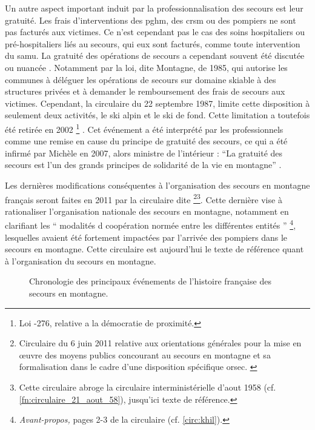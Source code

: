 Un autre aspect important induit par la professionnalisation des
secours est leur gratuité. Les frais d'interventions des \ac{pghm},
des \ac{crsm} ou des pompiers ne sont pas facturés aux victimes. Ce
n'est cependant pas le cas des soins hospitaliers ou pré-hospitaliers
liés au secours, qui eux sont facturés, comme toute intervention du
\ac{samu}. La gratuité des opérations de secours a cependant souvent
été discutée ou nuancée \autocite{CFDLD, Halle2007,
  Magne2017}. Notamment par la loi, dite Montagne, de 1985, qui
autorise les communes à déléguer les opérations de secours sur domaine
skiable à des structures privées et à demander le remboursement des
frais de secours aux victimes. Cependant, la circulaire du 22
septembre 1987, limite cette disposition à seulement deux activités,
le ski alpin et le ski de fond. Cette limitation a toutefois été
retirée en 2002 \footnote{Loi -276, relative a la démocratie
  de proximité.}  \autocite{Magne2017}. Cet événement a été interprété
par les professionnels comme une remise en cause du principe de
gratuité des secours, ce qui a été infirmé par Michèle
 en 2007, alors ministre de l'intérieur : \enquote{La
  gratuité des secours est l’un des grands principes de solidarité de
  la vie en montagne} \autocite{CFDLD}.

Les dernières modifications conséquentes à l’organisation des secours
en montagne français seront faites en 2011 par la circulaire dite
 \footnote{Circulaire du 6 juin 2011 relative aux
  orientations générales pour la mise en œuvre des moyens publics
  concourant au secours en montagne et sa formalisation dans le cadre
  d’une disposition spécifique
  \ac{orsec}. \label{circ:khil}}\multiplefootnoteseparator\footnote{Cette
  circulaire abroge la circulaire interministérielle d'aout 1958
  (cf. \autoref{fn:circulaire_21_aout_58}), jusqu'ici texte de
  référence.}. Cette dernière vise à rationaliser l'organisation
nationale des secours en montagne, notamment en clarifiant les
\enquote{\textelp{} modalités d coopération normée entre
  les différentes entités \textelp{}} \footnote{\emph{Avant-propos,}
  pages 2-3 de la circulaire  (cf. \autoref{circ:khil}).},
lesquelles avaient été fortement impactées par l'arrivée des pompiers
dans le secours en montagne. Cette circulaire est aujourd'hui le texte
de référence quant à l'organisation du secours en montagne.

\begin{figure}
  \centering
   
   \caption{Chronologie des principaux événements de
     l'histoire française des secours en montagne.}
  \label{fig:frise_chronologique}
\end{figure}

